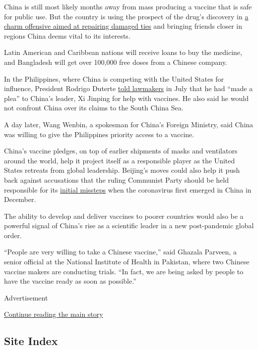 China is still most likely months away from mass producing a vaccine
that is safe for public use. But the country is using the prospect of
the drug's discovery in
\href{https://www.nytimes3xbfgragh.onion/2020/09/11/business/china-vaccine-diplomacy.html}{a
charm offensive aimed at repairing damaged ties} and bringing friends
closer in regions China deems vital to its interests.

Latin American and Caribbean nations will receive loans to buy the
medicine, and Bangladesh will get over 100,000 free doses from a Chinese
company.

In the Philippines, where China is competing with the United States for
influence, President Rodrigo Duterte
\href{https://www.scmp.com/week-asia/politics/article/3094918/duterte-seeks-chinese-coronavirus-vaccine-rules-out-us-bases}{told
lawmakers} in July that he had ``made a plea'' to China's leader, Xi
Jinping for help with vaccines. He also said he would not confront China
over its claims to the South China Sea.

A day later, Wang Wenbin, a spokesman for China's Foreign Ministry, said
China was willing to give the Philippines priority access to a vaccine.

China's vaccine pledges, on top of earlier shipments of masks and
ventilators around the world, help it project itself as a responsible
player as the United States retreats from global leadership. Beijing's
moves could also help it push back against accusations that the ruling
Communist Party should be held responsible for its
\href{https://www.nytimes3xbfgragh.onion/2020/08/19/world/asia/china-coronavirus-beijing-trump.html}{initial
missteps} when the coronavirus first emerged in China in December.

The ability to develop and deliver vaccines to poorer countries would
also be a powerful signal of China's rise as a scientific leader in a
new post-pandemic global order.

``People are very willing to take a Chinese vaccine,'' said Ghazala
Parveen, a senior official at the National Institute of Health in
Pakistan, where two Chinese vaccine makers are conducting trials. ``In
fact, we are being asked by people to have the vaccine ready as soon as
possible.''

Advertisement

\protect\hyperlink{after-bottom}{Continue reading the main story}

\hypertarget{site-index}{%
\subsection{Site Index}\label{site-index}}

